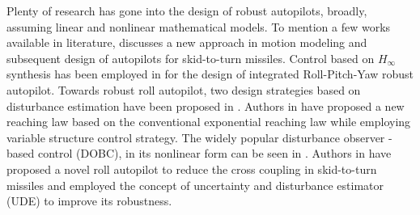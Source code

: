 \documentclass[conference]{IEEEtran}
\begin{document}

Plenty of research has gone into the design of robust autopilots, broadly, assuming linear and nonlinear mathematical models. To mention a few works available in literature, \cite{song2002} discusses a new approach in motion modeling and subsequent design of autopilots for skid-to-turn missiles. Control based on $H_{\infty}$ synthesis has been employed in \cite{kang2009} for the design of integrated Roll-Pitch-Yaw robust autopilot. Towards robust roll autopilot, two design strategies based on disturbance estimation have been proposed in \cite{sirisha2012}. Authors in \cite{luo2015} have proposed a new reaching law based on the conventional exponential reaching law while employing variable structure control strategy. The widely popular disturbance observer - based control (DOBC), in its nonlinear form can be seen in \cite{chen2016}. Authors in \cite{mohammadi2016} have proposed a novel roll autopilot to reduce the cross coupling in skid-to-turn missiles and employed the concept of uncertainty and disturbance estimator (UDE)  to improve its robustness.
\end{document}
